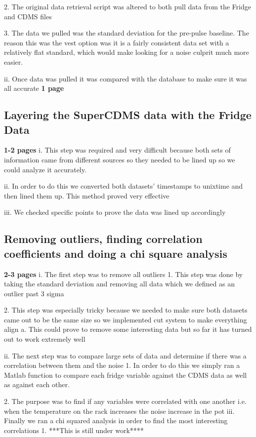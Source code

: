 2.	The original data retrieval script was altered to both pull data from the Fridge and CDMS files

3.	The data we pulled was the standard deviation for the pre-pulse baseline. The reason this was the vest option was it is a fairly consistent data set with a relatively flat standard, which would make looking for a noise culprit much more easier.

ii.	Once data was pulled it was compared with the database to make sure it was all accurate \textbf{1 page}

\subsection{Layering the SuperCDMS data with the Fridge Data} \textbf{1-2 pages}
i.	This step was required and very difficult because both sets of information came from different sources so they needed to be lined up so we could analyze it accurately.

ii.	In order to do this we converted both datasets’ timestamps to unixtime and then lined them up. This method proved very effective

iii.	We checked specific points to prove the data was lined up accordingly

\subsection{Removing outliers, finding correlation coefficients and doing a chi square analysis} \textbf{2-3 pages}
i.	The first step was to remove all outliers
1.	This step was done by taking the standard deviation and removing all data which we defined as an outlier past 3 sigma

2.	This step was especially tricky because we needed to make sure both datasets came out to be the same size so we implemented cut system to make everything align
a.	This could prove to remove some interesting data but so far it has turned out to work extremely well

ii.	The next step was to compare large sets of data and determine if there was a correlation between them and the noise
1.	In order to do this we simply ran a Matlab function to compare each fridge variable against the CDMS data as well as against each other.

2.	The purpose was to find if any variables were correlated with one another i.e. when the temperature on the rack increases the noise increase in the pot
iii.	Finally we ran a chi squared analysis in order to find the most interesting correlations
1.	***This is still under work****
